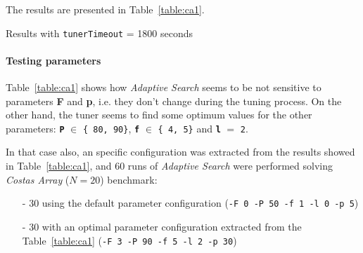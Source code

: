The results are presented in Table~\ref{table:ca1}.

\begin{table} 
\caption{Results with \texttt{tunerTimeout} = 1800 seconds}
\centering 
\renewcommand{\arraystretch}{1.2}
\label{table:ca1}
\end{table}

\paragraph{ Testing parameters}

Table~\ref{table:ca1} shows how {\it Adaptive Search} seems to be not sensitive to parameters {\bf F} and {\bf p}, i.e. they don't change during the tuning process. On the other hand, the tuner seems to find some optimum values for the other parameters: \texttt{\bf P} $\in$ \texttt{\{ 80, 90\}}, \texttt{\bf f} $\in$ \texttt{\{ 4, 5\}} and \texttt{\bf l} $=$ \texttt{2}.

In that case also, an specific configuration was extracted from the results showed in Table~\ref{table:ca1}, and 60 runs of {\it Adaptive Search} were performed solving {\it Costas Array} ($N = 20$) benchmark: 
\begin{itemize}
	\item[-] 30 using the default parameter configuration (\texttt{-F 0 -P 50 -f 1 -l 0 -p 5})
	\item[-] 30 with an optimal parameter configuration extracted from the Table~\ref{table:ca1} (\texttt{-F 3 -P 90 -f 5 -l 2 -p 30}) 
\end{itemize}

